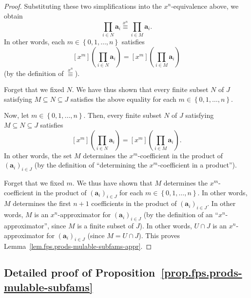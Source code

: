 \begin{proof}
Substituting these two simplifications into the
$x^n$-equivalence above, we obtain
\[
\prod_{i \in N} \mathbf{a}_{i} \overset{x^n}{\equiv}
\prod_{i \in M} \mathbf{a}_{i}.
\]
In other words, each $m \in \left\{0, 1, \ldots, n\right\}$ satisfies
\[
\left[x^{m}\right] \left(\prod_{i \in N} \mathbf{a}_{i}\right)
= \left[x^{m}\right] \left(\prod_{i \in M} \mathbf{a}_{i}\right)
\]
(by the definition of $\overset{x^n}{\equiv}$).

Forget that we fixed $N$. We have thus shown that every finite subset
$N$ of $J$ satisfying $M \subseteq N \subseteq J$ satisfies the above
equality for each $m \in \left\{0, 1, \ldots, n\right\}$.

Now, let $m \in \left\{0, 1, \ldots, n\right\}$. Then, every finite
subset $N$ of $J$ satisfying $M \subseteq N \subseteq J$ satisfies
\[
\left[x^{m}\right] \left(\prod_{i \in N} \mathbf{a}_{i}\right)
= \left[x^{m}\right] \left(\prod_{i \in M} \mathbf{a}_{i}\right).
\]
In other words, the set $M$ determines the $x^m$-coefficient in the
product of $\left(\mathbf{a}_{i}\right)_{i \in J}$ (by the definition
of ``determining the $x^m$-coefficient in a product'').

Forget that we fixed $m$. We thus have shown that $M$ determines the
$x^m$-coefficient in the product of
$\left(\mathbf{a}_{i}\right)_{i \in J}$ for each
$m \in \left\{0, 1, \ldots, n\right\}$. In other words, $M$ determines
the first $n+1$ coefficients in the product of
$\left(\mathbf{a}_{i}\right)_{i \in J}$. In other words, $M$ is an
$x^n$-approximator for $\left(\mathbf{a}_{i}\right)_{i \in J}$ (by the
definition of an ``$x^n$-approximator'', since $M$ is a finite subset
of $J$). In other words, $U \cap J$ is an $x^n$-approximator for
$\left(\mathbf{a}_{i}\right)_{i \in J}$ (since $M = U \cap J$).
This proves Lemma~\ref{lem.fps.prods-mulable-subfams-appr}.
\end{proof}

\subsection{Detailed proof of Proposition~\ref{prop.fps.prods-mulable-subfams}}

